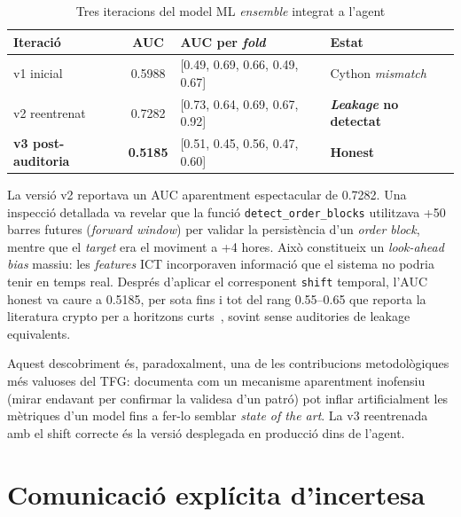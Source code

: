 \documentclass[12pt, a4paper]{report}
\begin{document}
\begin{table}[H]
\centering
\caption{Tres iteracions del model ML \textit{ensemble} integrat a l'agent}
\label{tab:ml-iterations}
\begin{tabular}{@{}L{3.5cm}cL{5cm}L{3.5cm}@{}}
\toprule
\textbf{Iteració} & \textbf{AUC} & \textbf{AUC per \textit{fold}} & \textbf{Estat} \\
\midrule
v1 inicial          & 0.5988 & [0.49, 0.69, 0.66, 0.49, 0.67] & Cython \textit{mismatch} \\
v2 reentrenat       & 0.7282 & [0.73, 0.64, 0.69, 0.67, 0.92] & \textbf{\textit{Leakage} no detectat} \\
\textbf{v3 post-auditoria} & \textbf{0.5185} & [0.51, 0.45, 0.56, 0.47, 0.60] & \textcolor{accentgreen}{\textbf{Honest}} \\
\bottomrule
\end{tabular}
\end{table}

\begin{warningbox}
La versió v2 reportava un AUC aparentment espectacular de 0.7282. Una inspecció detallada va revelar que la funció \texttt{detect\_order\_blocks} utilitzava +50 barres futures (\emph{forward window}) per validar la persistència d'un \textit{order block}, mentre que el \emph{target} era el moviment a +4 hores. Això constitueix un \textit{look-ahead bias} massiu: les \textit{features} ICT incorporaven informació que el sistema no podria tenir en temps real. Després d'aplicar el corresponent \texttt{shift} temporal, l'AUC honest va caure a 0.5185, per sota fins i tot del rang 0.55--0.65 que reporta la literatura crypto per a horitzons curts~\cite{sebastiao2021}, sovint sense auditories de leakage equivalents.
\end{warningbox}

Aquest descobriment és, paradoxalment, una de les contribucions metodològiques més valuoses del TFG: documenta com un mecanisme aparentment inofensiu (mirar endavant per confirmar la validesa d'un patró) pot inflar artificialment les mètriques d'un model fins a fer-lo semblar \textit{state of the art}. La v3 reentrenada amb el shift correcte és la versió desplegada en producció dins de l'agent.

\section{Comunicació explícita d'incertesa}
\end{document}
